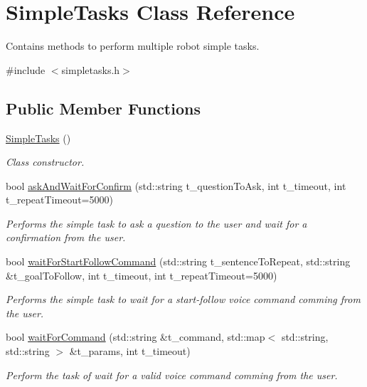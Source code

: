\hypertarget{class_simple_tasks}{}\section{Simple\+Tasks Class Reference}
\label{class_simple_tasks}


Contains methods to perform multiple robot simple tasks.  




{\ttfamily \#include $<$simpletasks.\+h$>$}

\subsection*{Public Member Functions}
\begin{DoxyCompactItemize}
\item 
\hyperlink{class_simple_tasks_a2c01b91079593cf7be1a217d35326afb}{Simple\+Tasks} ()
\begin{DoxyCompactList}\small\item\em Class constructor. \end{DoxyCompactList}\item 
bool \hyperlink{class_simple_tasks_ac72035a3f58ac7103cb8ae73666dfd06}{ask\+And\+Wait\+For\+Confirm} (std\+::string t\+\_\+question\+To\+Ask, int t\+\_\+timeout, int t\+\_\+repeat\+Timeout=5000)
\begin{DoxyCompactList}\small\item\em Performs the simple task to ask a question to the user and wait for a confirmation from the user. \end{DoxyCompactList}\item 
bool \hyperlink{class_simple_tasks_af7a9088f0d7c9158b90e7c6c7bc57f93}{wait\+For\+Start\+Follow\+Command} (std\+::string t\+\_\+sentence\+To\+Repeat, std\+::string \&t\+\_\+goal\+To\+Follow, int t\+\_\+timeout, int t\+\_\+repeat\+Timeout=5000)
\begin{DoxyCompactList}\small\item\em Performs the simple task to wait for a start-\/follow voice command comming from the user. \end{DoxyCompactList}\item 
bool \hyperlink{class_simple_tasks_ae9e4541c3e71d536b21e24c81f216235}{wait\+For\+Command} (std\+::string \&t\+\_\+command, std\+::map$<$ std\+::string, std\+::string $>$ \&t\+\_\+params, int t\+\_\+timeout)
\begin{DoxyCompactList}\small\item\em Perform the task of wait for a valid voice command comming from the user. \end{DoxyCompactList}\item 

\end{DoxyCompactItemize}
